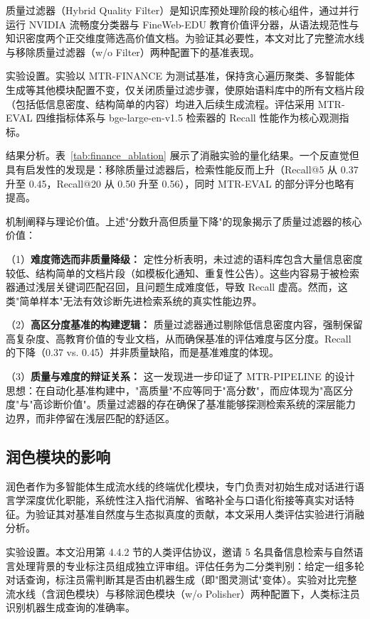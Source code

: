 质量过滤器（Hybrid Quality Filter）是知识库预处理阶段的核心组件，通过并行运行 NVIDIA 流畅度分类器与 FineWeb-EDU 教育价值评分器，从语法规范性与知识密度两个正交维度筛选高价值文档。为验证其必要性，本文对比了完整流水线与移除质量过滤器（w/o Filter）两种配置下的基准表现。

实验设置。实验以 MTR-FINANCE 为测试基准，保持贪心遍历聚类、多智能体生成等其他模块配置不变，仅关闭质量过滤步骤，使原始语料库中的所有文档片段（包括低信息密度、结构简单的内容）均进入后续生成流程。评估采用 MTR-EVAL 四维指标体系与 bge-large-en-v1.5 检索器的 Recall 性能作为核心观测指标。

结果分析。表~\ref{tab:finance_ablation} 展示了消融实验的量化结果。一个反直觉但具有启发性的发现是：移除质量过滤器后，检索性能反而上升（Recall@5 从 0.37 升至 0.45，Recall@20 从 0.50 升至 0.56），同时 MTR-EVAL 的部分评分也略有提高。


机制阐释与理论价值。上述"分数升高但质量下降"的现象揭示了质量过滤器的核心价值：

（1）\textbf{难度筛选而非质量降级：} 定性分析表明，未过滤的语料库包含大量信息密度较低、结构简单的文档片段（如模板化通知、重复性公告）。这些内容易于被检索器通过浅层关键词匹配召回，且问题生成难度低，导致 Recall 虚高。然而，这类"简单样本"无法有效诊断先进检索系统的真实性能边界。

（2）\textbf{高区分度基准的构建逻辑：} 质量过滤器通过剔除低信息密度内容，强制保留高复杂度、高教育价值的专业文档，从而确保基准的评估难度与区分度。Recall 的下降（0.37 vs. 0.45）并非质量缺陷，而是基准难度的体现。

（3）\textbf{质量与难度的辩证关系：} 这一发现进一步印证了 MTR-PIPELINE 的设计思想：在自动化基准构建中，"高质量"不应等同于"高分数"，而应体现为"高区分度"与"高诊断价值"。质量过滤器的存在确保了基准能够探测检索系统的深层能力边界，而非停留在浅层匹配的舒适区。


\subsection{润色模块的影响}
\label{subsec:polisher_ablation}

润色者作为多智能体生成流水线的终端优化模块，专门负责对初始生成对话进行语言学深度优化职能，系统性注入指代消解、省略补全与口语化衔接等真实对话特征。为验证其对基准自然度与生态拟真度的贡献，本文采用人类评估实验进行消融分析。

实验设置。本文沿用第 4.4.2 节的人类评估协议，邀请 5 名具备信息检索与自然语言处理背景的专业标注员组成独立评审组。评估任务为二分类判别：给定一组多轮对话查询，标注员需判断其是否由机器生成（即"图灵测试"变体）。实验对比完整流水线（含润色模块）与移除润色模块（w/o Polisher）两种配置下，人类标注员识别机器生成查询的准确率。


